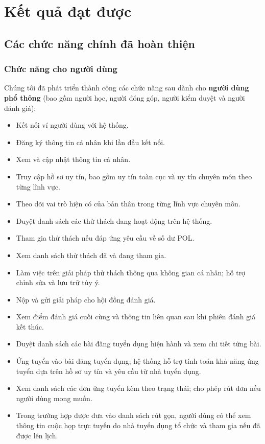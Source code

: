 \chapter{Kết quả đạt được}

\section{Các chức năng chính đã hoàn thiện}
\subsection{Chức năng cho người dùng}

Chúng tôi đã phát triển thành công các chức năng sau dành cho \textbf{người dùng phổ thông} (bao gồm người học, người đóng góp, người kiểm duyệt và người đánh giá):

\begin{itemize}
  \item Kết nối ví người dùng với hệ thống.
  \item Đăng ký thông tin cá nhân khi lần đầu kết nối.
  \item Xem và cập nhật thông tin cá nhân.
  \item Truy cập hồ sơ uy tín, bao gồm uy tín toàn cục và uy tín chuyên môn theo từng lĩnh vực.
  \item Theo dõi vai trò hiện có của bản thân trong từng lĩnh vực chuyên môn.
  \item Duyệt danh sách các thử thách đang hoạt động trên hệ thống.
  \item Tham gia thử thách nếu đáp ứng yêu cầu về số dư POL.
  \item Xem danh sách thử thách đã và đang tham gia.
  \item Làm việc trên giải pháp thử thách thông qua không gian cá nhân; hỗ trợ chỉnh sửa và lưu trữ tùy ý.
  \item Nộp và gửi giải pháp cho hội đồng đánh giá.
  \item Xem điểm đánh giá cuối cùng và thông tin liên quan sau khi phiên đánh giá kết thúc.
  \item Duyệt danh sách các bài đăng tuyển dụng hiện hành và xem chi tiết từng bài.
  \item Ứng tuyển vào bài đăng tuyển dụng; hệ thống hỗ trợ tính toán khả năng ứng tuyển dựa trên hồ sơ uy tín và yêu cầu từ nhà tuyển dụng.
  \item Xem danh sách các đơn ứng tuyển kèm theo trạng thái; cho phép rút đơn nếu người dùng mong muốn.
  \item Trong trường hợp được đưa vào danh sách rút gọn, người dùng có thể xem thông tin cuộc họp trực tuyến do nhà tuyển dụng tổ chức và tham gia nếu đã được lên lịch.
\end{itemize}


